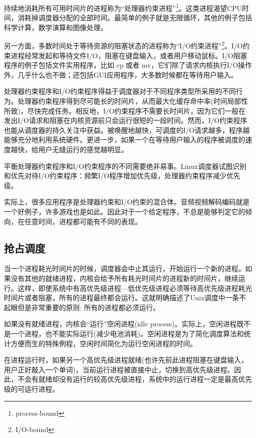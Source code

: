 持续地消耗所有可用时间片的进程称为“处理器约束进程”\footnote[1]{process-bound}。这类进程渴望CPU时间，消耗掉调度器分配的全部时间。最简单的例子就是无限循环，其他的例子包括科学计算，数学演算和图像处理。

另一方面，多数时间处于等待资源的阻塞状态的进程称为“I/O约束进程”\footnote[2]{I/O-bound}。I/O约束进程经常发起和等待文件I/O，阻塞在键盘输入，或者用户移动鼠标。I/O阻塞程序的例子包括文件实用程序，比如 cp 或者 mv，它们除了请求内核执行I/O操作外，几乎什么也不做；还包括GUI应用程序，大多数时候都在等待用户输入。

处理器约束程序和I/O约束程序得益于调度器对于不同程序类型所采用的不同行为。处理器约束程序得到尽可能长的时间片，从而最大化缓存命中率(时间局部性所致)，尽快完成任务。相反地，I/O约束程序不需要长时间片，因为它们一般在发出I/O请求和阻塞在内核资源前只会运行很短的一段时间。然而，I/O约束程序也能从调度器的持久关注中获益。被唤醒地越快，可调度的I/O请求越多，程序越能够充分地利用系统硬件。更进一步，如果一个在等待用户输入的程序被调度的速度越快，给用户无缝运行的感觉越明显。

平衡处理器约束程序和I/O约束程序的不同需要绝非易事。Linux调度器试图识别和优先对待I/O约束程序：频繁I/O程序增加优先级，处理器约束程序减少优先级。

实际上，很多应用程序是处理器约束和I/O约束的混合体。音频视频解码编码就是一个好例子，许多游戏也是如此。因此对于一个给定程序，不总是能够判定它的倾向，在任意时间，进程都可能有不同的表现。

\subsection{抢占调度}

当一个进程耗光时间片的时候，调度器会中止其运行，开始运行一个新的进程。如果没有其他的就绪进程，内核会给予所有耗光时间片的进程新的时间片，继续运行。这样，即使系统中有高优先级进程---低优先级进程必须等待高优先级进程耗光时间片或者阻塞，所有的进程最终都会运行。这就明确描述了Unix调度中一条不起眼但是非常重要的原则: 所有的进程都必须运行。

如果没有就绪进程，内核会“运行”空闲进程(idle process)。实际上，空闲进程既不是一个进程，也不能实际运行(减少电池消耗)。空闲进程是为了简化调度算法和统计方便而生的特殊例程，空闲时间简化为运行空闲进程的时间。

在进程运行时，如果另一个高优先级进程就绪(也许先前此进程阻塞在键盘输入，用户正好敲入一个单词)，当前运行进程被直接中止，切换到高优先级进程。因此，不会有就绪却没有运行的较高优先级进程，系统中的运行进程一定是最高优先级的可运行进程。

